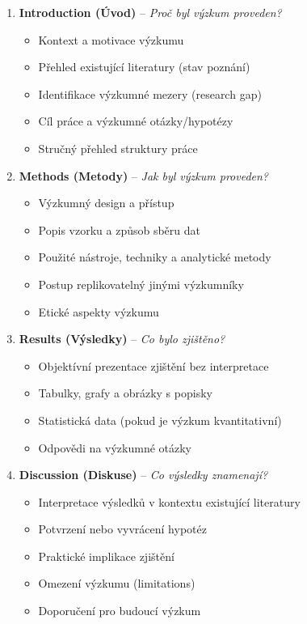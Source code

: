 \begin{enumerate}
  \item \textbf{Introduction (Úvod)} -- \textit{Proč byl výzkum proveden?}
    \begin{itemize}
      \item Kontext a motivace výzkumu
      \item Přehled existující literatury (stav poznání)
      \item Identifikace výzkumné mezery (research gap)
      \item Cíl práce a výzkumné otázky/hypotézy
      \item Stručný přehled struktury práce
    \end{itemize}

  \item \textbf{Methods (Metody)} -- \textit{Jak byl výzkum proveden?}
    \begin{itemize}
      \item Výzkumný design a přístup
      \item Popis vzorku a způsob sběru dat
      \item Použité nástroje, techniky a analytické metody
      \item Postup replikovatelný jinými výzkumníky
      \item Etické aspekty výzkumu
    \end{itemize}

  \item \textbf{Results (Výsledky)} -- \textit{Co bylo zjištěno?}
    \begin{itemize}
      \item Objektívní prezentace zjištění bez interpretace
      \item Tabulky, grafy a obrázky s popisky
      \item Statistická data (pokud je výzkum kvantitativní)
      \item Odpovědi na výzkumné otázky
    \end{itemize}

  \item \textbf{Discussion (Diskuse)} -- \textit{Co výsledky znamenají?}
    \begin{itemize}
      \item Interpretace výsledků v kontextu existující literatury
      \item Potvrzení nebo vyvrácení hypotéz
      \item Praktické implikace zjištění
      \item Omezení výzkumu (limitations)
      \item Doporučení pro budoucí výzkum
    \end{itemize}
\end{enumerate}

